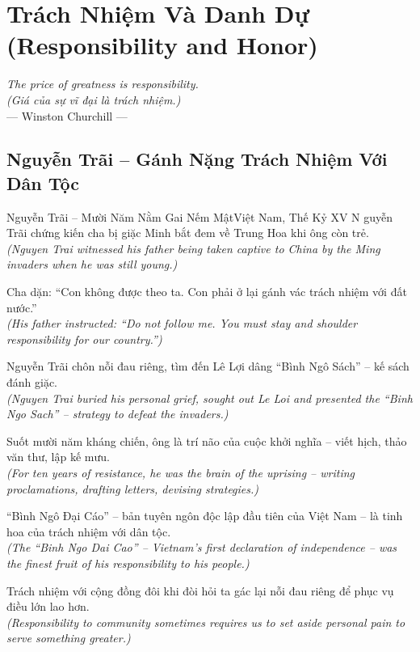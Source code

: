 \chapter{Trách Nhiệm Và Danh Dự (Responsibility and Honor)}
\begin{center}
  \textit{\color{truyenblue}The price of greatness is responsibility.}\\
  \textit{(Giá của sự vĩ đại là trách nhiệm.)}\\[4pt]
  \small\color{truyengold}--- Winston Churchill ---
\end{center}
\ngancach

\section{Nguyễn Trãi -- Gánh Nặng Trách Nhiệm Với Dân Tộc}
\begin{truyen}{Nguyễn Trãi -- Mười Năm Nằm Gai Nếm Mật}{Việt Nam, Thế Kỷ XV}
N guyễn Trãi chứng kiến cha bị giặc Minh bắt đem về Trung Hoa khi ông còn trẻ.\\
\textit{(Nguyen Trai witnessed his father being taken captive to China by the Ming invaders when he was still young.)}

Cha dặn: ``Con không được theo ta. Con phải ở lại gánh vác trách nhiệm với đất nước.''\\
\textit{(His father instructed: ``Do not follow me. You must stay and shoulder responsibility for our country.'')}

Nguyễn Trãi chôn nỗi đau riêng, tìm đến Lê Lợi dâng ``Bình Ngô Sách'' -- kế sách đánh giặc.\\
\textit{(Nguyen Trai buried his personal grief, sought out Le Loi and presented the ``Binh Ngo Sach'' -- strategy to defeat the invaders.)}

Suốt mười năm kháng chiến, ông là trí não của cuộc khởi nghĩa -- viết hịch, thảo văn thư, lập kế mưu.\\
\textit{(For ten years of resistance, he was the brain of the uprising -- writing proclamations, drafting letters, devising strategies.)}

``Bình Ngô Đại Cáo'' -- bản tuyên ngôn độc lập đầu tiên của Việt Nam -- là tinh hoa của trách nhiệm với dân tộc.\\
\textit{(The ``Binh Ngo Dai Cao'' -- Vietnam's first declaration of independence -- was the finest fruit of his responsibility to his people.)}

\end{truyen}
\begin{baihoc}
  Trách nhiệm với cộng đồng đôi khi đòi hỏi ta gác lại nỗi đau riêng để phục vụ điều lớn lao hơn.\\
  \textit{(Responsibility to community sometimes requires us to set aside personal pain to serve something greater.)}
\end{baihoc}

